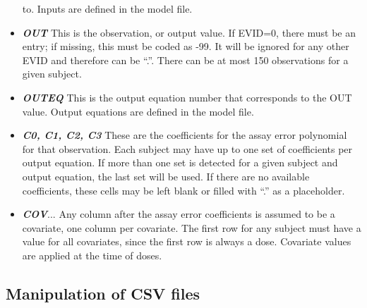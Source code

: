 \documentclass[
]{book}
\begin{document}
\begin{itemize}
  to. Inputs are defined in the model file.
\item
  \textbf{\emph{OUT}} This is the observation, or output value. If EVID=0, there
  must be an entry; if missing, this must be coded as -99. It will be
  ignored for any other EVID and therefore can be ``.''. There can be at
  most 150 observations for a given subject.
\item
  \textbf{\emph{OUTEQ}} This is the output equation number that corresponds to the
  OUT value. Output equations are defined in the model file.
\item
  \textbf{\emph{C0, C1, C2, C3}} These are the coefficients for the assay error
  polynomial for that observation. Each subject may have up to one set
  of coefficients per output equation. If more than one set is detected
  for a given subject and output equation, the last set will be used. If
  there are no available coefficients, these cells may be left blank or
  filled with ``.'' as a placeholder.
\item
  \textbf{\emph{COV}}... Any column after the assay error coefficients is assumed
  to be a covariate, one column per covariate. The first row for any subject
  must have a value for all covariates, since the first row is always a dose.
  Covariate values are applied at the time of doses.
\end{itemize}

\hypertarget{manipulation-of-csv-files}{%
\subsection{Manipulation of CSV files}\label{manipulation-of-csv-files}}
\end{document}
